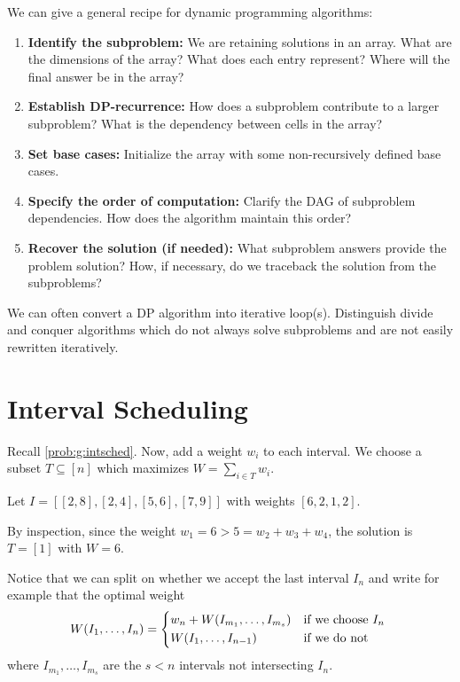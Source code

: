 We can give a general recipe for dynamic programming algorithms:
\begin{enumerate}[1.]
  \item \textbf{Identify the subproblem:}
        We are retaining solutions in an array.
        What are the dimensions of the array?
        What does each entry represent?
        Where will the final answer be in the array?
  \item \textbf{Establish DP-recurrence:}
        How does a subproblem contribute to a larger subproblem?
        What is the dependency between cells in the array?
  \item \textbf{Set base cases:}
        Initialize the array with some non-recursively defined base cases.
  \item \textbf{Specify the order of computation:}
        Clarify the DAG of subproblem dependencies.
        How does the algorithm maintain this order?
  \item \textbf{Recover the solution (if needed):}
        What subproblem answers provide the problem solution?
        How, if necessary, do we traceback the solution from the subproblems?
\end{enumerate}

We can often convert a DP algorithm into iterative loop(s).
Distinguish divide and conquer algorithms which do not always solve subproblems
and are not easily rewritten iteratively.

\section{Interval Scheduling}

\begin{problem}
  Recall \cref{prob:g:intsched}.
  Now, add a weight $w_i$ to each interval.
  We choose a subset $T \subseteq [n]$ which maximizes $W = \sum_{i \in T} w_i$.
\end{problem}

\begin{example}
  Let $I = [[2,8], [2,4], [5,6], [7,9]]$ with weights $[6,2,1,2]$.
\end{example}
\begin{sol}
  By inspection, since the weight $w_1 = 6 > 5 = w_2 + w_3 + w_4$,
  the solution is $T = [1]$ with $W = 6$.
\end{sol}

Notice that we can split on whether we accept the last interval $I_n$
and write for example that the optimal weight
\[
  W(I_1,\dotsc,I_n) = \begin{cases*}
    w_n + W(I_{m_1},\dotsc,I_{m_s}) & if we choose $I_n$ \\
    W(I_1,\dotsc,I_{n-1})           & if we do not
  \end{cases*}
\]
where $I_{m_1},\dotsc,I_{m_s}$ are the $s < n$ intervals not intersecting $I_n$.

